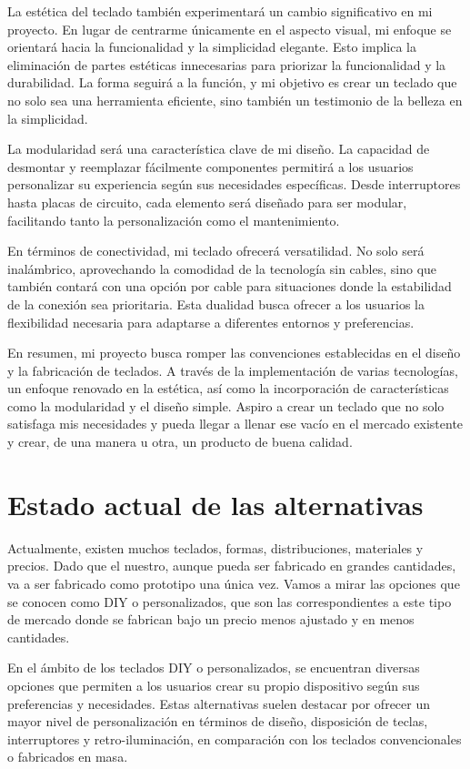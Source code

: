 La estética del teclado también experimentará un cambio significativo en mi proyecto. En lugar de centrarme únicamente en el aspecto visual, mi enfoque se orientará hacia la funcionalidad y la simplicidad elegante. Esto implica la eliminación de partes estéticas innecesarias para priorizar la funcionalidad y la durabilidad. La forma seguirá a la función, y mi objetivo es crear un teclado que no solo sea una herramienta eficiente, sino también un testimonio de la belleza en la simplicidad.

La modularidad será una característica clave de mi diseño. La capacidad de desmontar y reemplazar fácilmente componentes permitirá a los usuarios personalizar su experiencia según sus necesidades específicas. Desde interruptores hasta placas de circuito, cada elemento será diseñado para ser modular, facilitando tanto la personalización como el mantenimiento.

En términos de conectividad, mi teclado ofrecerá versatilidad. No solo será inalámbrico, aprovechando la comodidad de la tecnología sin cables, sino que también contará con una opción por cable para situaciones donde la estabilidad de la conexión sea prioritaria. Esta dualidad busca ofrecer a los usuarios la flexibilidad necesaria para adaptarse a diferentes entornos y preferencias.

En resumen, mi proyecto busca romper las convenciones establecidas en el diseño y la fabricación de teclados. A través de la implementación de varias tecnologías, un enfoque renovado en la estética, así como la incorporación de características como la modularidad y el diseño simple. Aspiro a crear un teclado que no solo satisfaga mis necesidades y pueda llegar a llenar ese vacío en el mercado existente y crear, de una manera u otra, un producto de buena calidad.
\pagebreak

\section{Estado actual de las alternativas}
Actualmente, existen muchos teclados, formas, distribuciones, materiales y precios. \cite{cdw-keyboards} Dado que el nuestro, aunque pueda ser fabricado en grandes cantidades, va a ser fabricado como prototipo una única vez. Vamos a mirar las opciones que se conocen como \gls{DIY} o personalizados, que son las correspondientes a este tipo de mercado donde se fabrican bajo un precio menos ajustado y en menos cantidades.

En el ámbito de los teclados \gls{DIY} o personalizados, se encuentran diversas opciones que permiten a los usuarios crear su propio dispositivo según sus preferencias y necesidades. Estas alternativas suelen destacar por ofrecer un mayor nivel de personalización en términos de diseño, disposición de teclas, interruptores y retro-iluminación, en comparación con los teclados convencionales o fabricados en masa. \cite{Diy-Keyboard-POPSC}

